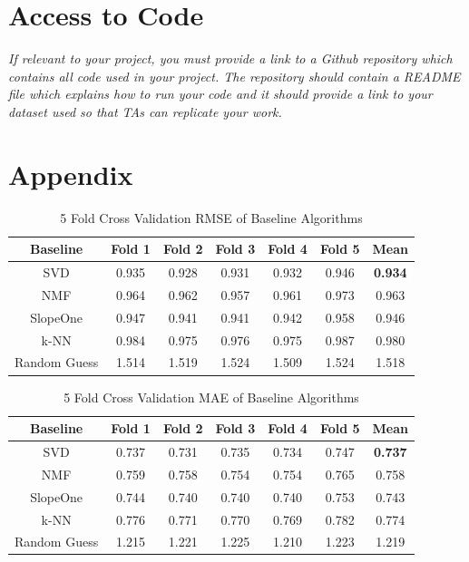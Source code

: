 \documentclass{article}
\begin{document}
\section{Access to Code}

\textit{If relevant to your project, you must provide a link to a Github repository which contains all code used in your project. The repository should contain a README file which explains how to run your code and it should provide a link to your dataset used so that TAs can replicate your work.}

\newpage

\section{Appendix}

\begin{table}[H]
    \centering
        \begin{tabular}{|c c c c c c c|} 
         \hline
         Baseline & Fold 1 & Fold 2 & Fold 3 & Fold 4 & Fold 5 & Mean \\ [0.5ex] 
         \hline\hline
         SVD & 0.935 & 0.928 & 0.931 & 0.932 & 0.946 & \bfseries 0.934 \\ 
         \hline
         NMF & 0.964 & 0.962 & 0.957 & 0.961 & 0.973 & 0.963 \\
         \hline
         SlopeOne & 0.947 & 0.941 & 0.941 & 0.942 & 0.958 & 0.946 \\
         \hline
         k-NN & 0.984 & 0.975 & 0.976 & 0.975 & 0.987 & 0.980 \\
         \hline
         Random Guess & 1.514 & 1.519 & 1.524 & 1.509 & 1.524 & 1.518 \\ [1ex] 
         \hline
        \end{tabular}
    \caption{5 Fold Cross Validation RMSE of Baseline Algorithms}
    \label{tab:rmse_results}
\end{table}

\begin{table}[H]
    \centering
        \begin{tabular}{|c c c c c c c|} 
         \hline
         Baseline & Fold 1 & Fold 2 & Fold 3 & Fold 4 & Fold 5 & Mean \\ [0.5ex] 
         \hline\hline
         SVD & 0.737 & 0.731 & 0.735 & 0.734 & 0.747 & \bfseries 0.737 \\ 
         \hline
         NMF & 0.759 & 0.758 & 0.754 & 0.754 & 0.765 & 0.758 \\
         \hline
         SlopeOne & 0.744 & 0.740 & 0.740 & 0.740 & 0.753 & 0.743 \\
         \hline
         k-NN & 0.776 & 0.771 & 0.770 & 0.769 & 0.782 & 0.774 \\
         \hline
         Random Guess & 1.215 & 1.221 & 1.225 & 1.210 & 1.223 & 1.219 \\ [1ex] 
         \hline
        \end{tabular}
    \caption{5 Fold Cross Validation MAE of Baseline Algorithms}
    \label{tab:mae_results}
\end{table}
\end{document}
